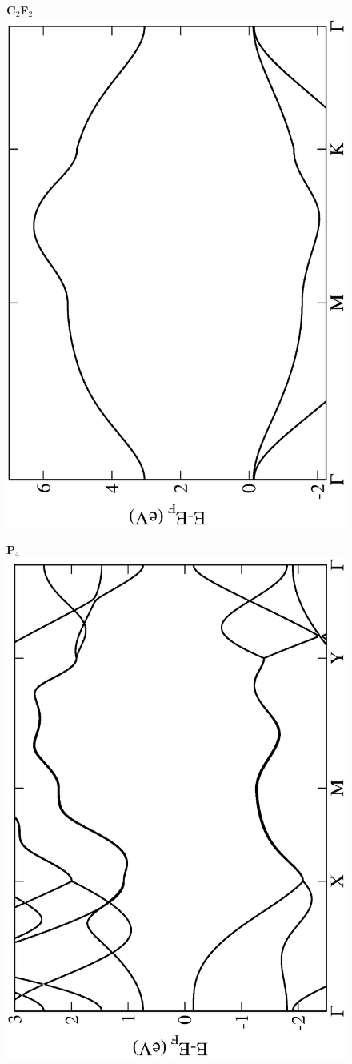 \begin{figure}[htbp]
\centering
{\bfseries \sffamily C$_{2}$F$_{2}$}\\
\includegraphics[width=0.45\linewidth, angle=-90, trim={2.9cm, 0cm, 2cm, 0cm}, clip]{img/SI_figs/BS/FGraph.eps}
\end{figure}

\begin{figure}[htbp]
\centering
{\bfseries \sffamily P$_{4}$}\\
\includegraphics[width=0.45\linewidth, angle=-90, trim={2.9cm, 0cm, 2cm, 0cm}, clip]{img/SI_figs/BS/Phosphorene.eps}
\end{figure}


